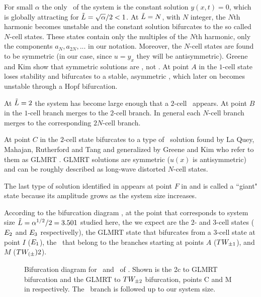 For small $\alpha$ the only \eqv\ of the system is the constant solution $y(x,t)=0$,
which is globally attracting
for $\tilde{L}=\sqrt{\alpha}/2<1$. At $\tilde{L}=N$, with $N$ integer,
the $N$th harmonic becomes unstable and the constant solution
bifurcates to the so called $N$-cell states.
These states contain only the multiples of the $N$th
harmonic, {\ie} only the components $a_N,a_{2N},...$ in our notation.
Moreover, the $N$-cell states are found to be symmetric (in our case, since $u=y_x$ they will be
antisymmetric).
Greene and Kim show that symmetric solutions are \eqva, not \reqva.
At point $A$ in  the $1$-cell state loses stability
and bifurcates to a stable,
asymmetric \reqv, which later on becomes unstable through a Hopf bifurcation.

At $\tilde{L}=2$ the system has become large enough that a $2$-cell \eqv\ appears. At point $B$
in  the $1$-cell branch merges to the $2$-cell branch. In general each $N$-cell branch merges to the corresponding $2N$-cell branch.

At point $C$ in  the $2$-cell state bifurcates to a type of
\eqv\ solution
found by La Quey, Mahajan, Rutherford and Tang and generalized by Greene and Kim who refer to them as GLMRT \eqva. GLMRT solutions are symmetric
($u(x)$ is antisymmetric)
and can be roughly described as long-wave distorted $N$-cell states.

The last type of solution identified in  appears at point $F$
in  and is called a
``giant" state because its amplitude grows as the system size increases.

According to the bifurcation diagram ,
at the point that corresponds to system size $\tilde{L}=\alpha^{1/2}/2=3.501$
studied here,
the {\eqva} we expect are the $2$- and $3$-cell states ($E_{2}$ and $E_{3}$ respectivelly), the GLMRT state that bifurcates from a $3$-cell state at point $I$ ($E_{1}$),
the \reqva\ that belong to the branches starting at points $A$ ($TW_{\pm1}$),
and $M$ ($TW_{(\pm}){2}$).

\begin{figure}\label{fig:ksBifDiag}
\begin{center}
\end{center}
\caption[Bifurcation diagram for equilibria of Kuramoto-Sivashinsky eq.]
    {
    Bifurcation diagram for \eqva\ and \reqva\ of \KSe.
    Shown is the 2c to GLMRT bifurcation and the GLMRT to $TW_{\pm2}$ bifurcation,
    points C and M in  respectively. The \reqv\ branch
    is followed up to our system size.
        }
\end{figure}

